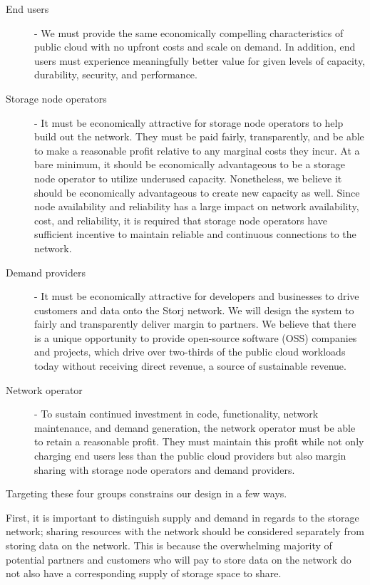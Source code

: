 \documentclass[11pt,fleqn,openany]{book}
\begin{document}
\begin{description}
\item[End users] - We must provide the same economically compelling
  characteristics of public cloud with no upfront costs and scale on demand.
  In addition, end users must experience meaningfully better value for given
  levels of capacity, durability, security, and performance.

\item[Storage node operators] - It must be economically attractive for storage
  node operators to help build out the network.
  They must be paid fairly, transparently, and be able to make a
  reasonable profit relative to any marginal costs they incur.
  At a bare minimum, it should be economically advantageous to be a storage
  node operator to utilize underused capacity. Nonetheless, we believe it should be
  economically advantageous to create new capacity as well.
  Since node availability and reliability has a large impact on network
  availability, cost, and reliability, it is required that storage node
  operators have sufficient incentive to maintain reliable and continuous
  connections to the network.

\item[Demand providers] - It must be economically attractive for developers and
  businesses to drive customers and data onto the Storj network. We will design
  the system to fairly and transparently deliver margin to partners. We believe
  that there is a unique opportunity to provide open-source software (OSS)
  companies and projects, which drive over two-thirds of the public cloud workloads
  today without receiving direct revenue, a source of sustainable revenue.

\item[Network operator] - To sustain continued investment in code, 
functionality, network maintenance, and demand generation, the network 
operator must be able to retain a reasonable profit. They must maintain this profit while 
not only charging end users less than the public cloud providers but also margin sharing 
with storage node operators and demand providers.
\end{description}

Targeting these four groups constrains our design in a few ways.

First, it is important to distinguish supply and demand in regards to the
storage network; sharing resources with the network should be considered
separately from storing data on the network. This is because
the overwhelming majority of potential partners and customers who will
pay to store data on the
network do not also have a corresponding supply of storage space to share.
\end{document}
